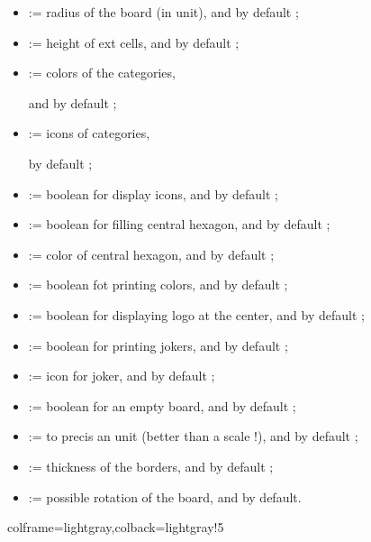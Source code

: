 \documentclass[11pt,a4paper]{ltxdoc}
\begin{document}
\begin{itemize}
	\item {} := radius of the board (in unit), and  by default ;
	\item {} := height of ext cells, and  by default ;
	\item {} := colors of the categories,
	
	\hfill{}and  by default ;
	\item {} := icons of categories,
	
	\hfill{} by default ;
	\item {} := boolean for display icons, and  by default ;
	\item {} := boolean for filling central hexagon, and  by default ;
	\item {} := color of central hexagon, and  by default ;
	\item {} := boolean fot printing colors, and  by default ;
	\item {} := boolean for displaying logo at the center, and  by default ;
	\item {} := boolean for printing jokers, and  by default ;
	\item {} := icon for joker, and  by default ;
	\item {} := boolean for an empty board, and  by default ;
	\item {} := to precis an unit (better than a scale !), and  by default ;
	\item {} := thickness of the borders, and \MontreCode{0.8pt} by default ;
	\item {} := possible rotation of the board, and  by default.
\end{itemize}

\begin{tcblisting}{colframe=lightgray,colback=lightgray!5}
\BoardTrivialPursuit[Rotation=35,Unit=0.5]
\BoardTrivialPursuit[Unit=0.5]
\end{tcblisting}
\end{document}

